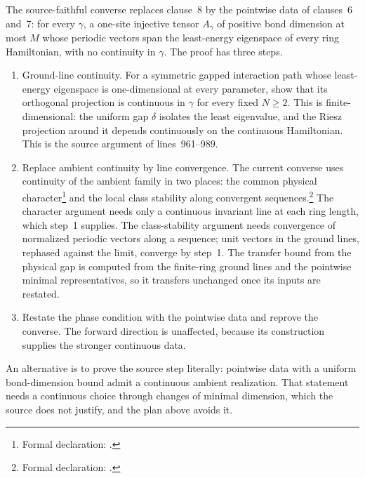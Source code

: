 \documentclass{article}
\begin{document}
The source-faithful converse replaces clause~8 by the pointwise data of
clauses~6 and~7: for every $\gamma$, a one-site injective tensor $A_\gamma$ of
positive bond dimension at most $M$ whose periodic vectors span the
least-energy eigenspace of every ring Hamiltonian, with no continuity in
$\gamma$. The proof has three steps.
\begin{enumerate}
    \item Ground-line continuity. For a symmetric gapped interaction path
          whose least-energy eigenspace is one-dimensional at every parameter,
          show that its orthogonal projection is continuous in $\gamma$ for
          every fixed $N\ge2$. This is finite-dimensional: the uniform gap
          $\delta$ isolates the least eigenvalue, and the Riesz projection
          around it depends continuously on the continuous Hamiltonian. This
          is the source argument of lines~961--989.
    \item Replace ambient continuity by line convergence. The current converse
          uses continuity of the ambient family in two places: the common
          physical character\footnote{Formal declaration:
              .}
          and the local class stability along convergent
          sequences.\footnote{Formal declaration:
              .}
          The character argument needs only a continuous invariant line at each
          ring length, which step~1 supplies. The class-stability argument
          needs convergence of normalized periodic vectors along a sequence;
          unit vectors in the ground lines, rephased against the limit, converge
          by step~1. The transfer bound from the physical gap is computed from
          the finite-ring ground lines and the pointwise minimal
          representatives, so it transfers unchanged once its inputs are
          restated.
    \item Restate the phase condition with the pointwise data and reprove the
          converse. The forward direction is unaffected, because its
          construction supplies the stronger continuous data.
\end{enumerate}
An alternative is to prove the source step literally: pointwise data with a
uniform bond-dimension bound admit a continuous ambient realization. That
statement needs a continuous choice through changes of minimal dimension,
which the source does not justify, and the plan above avoids it.



\end{document}
